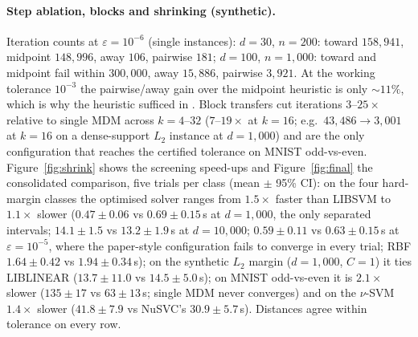 \documentclass{opt2026}   %
\begin{document}
\paragraph{Step ablation, blocks and shrinking (synthetic).} Iteration
counts at $\varepsilon=10^{-6}$ (single instances): $d{=}30$, $n{=}200$:
toward $158{,}941$, midpoint $148{,}996$, away $106$, pairwise $181$;
$d{=}100$, $n{=}1{,}000$: toward and midpoint fail within $300{,}000$,
away $15{,}886$, pairwise $3{,}921$. At the working tolerance $10^{-3}$
the pairwise/away gain over the midpoint heuristic is only $\sim\!11\%$,
which is why the heuristic sufficed in \cite{gupta2026}. Block transfers cut iterations $3$--$25\times$ relative to single MDM
across $k=4$--$32$ ($7$--$19\times$ at $k{=}16$; e.g.\
$43{,}486\to3{,}001$ at $k{=}16$ on a dense-support $L_2$ instance at
$d{=}1{,}000$)
and are the only configuration that reaches the certified tolerance on
MNIST odd-vs-even. Figure~\ref{fig:shrink} shows the screening
speed-ups and Figure~\ref{fig:final} the consolidated comparison,
five trials per class (mean $\pm$ 95\% CI): on the four hard-margin
classes the optimised solver ranges from $1.5\times$ faster than LIBSVM
to $1.1\times$ slower ($0.47\pm0.06$ vs $0.69\pm0.15$\,s at
$d{=}1{,}000$, the only separated intervals; $14.1\pm1.5$ vs
$13.2\pm1.9$\,s at $d{=}10{,}000$; $0.59\pm0.11$ vs $0.63\pm0.15$\,s at
$\varepsilon{=}10^{-5}$, where the paper-style configuration fails to
converge in every trial; RBF $1.64\pm0.42$ vs $1.94\pm0.34$\,s); on the
synthetic $L_2$ margin ($d{=}1{,}000$, $C{=}1$) it ties LIBLINEAR
($13.7\pm11.0$ vs $14.5\pm5.0$\,s); on MNIST odd-vs-even it is
$2.1\times$ slower ($135\pm17$ vs $63\pm13$\,s; single MDM never
converges) and on the $\nu$-SVM $1.4\times$ slower ($41.8\pm7.9$ vs
NuSVC's $30.9\pm5.7$\,s). Distances agree within tolerance on every
row.
\end{document}
